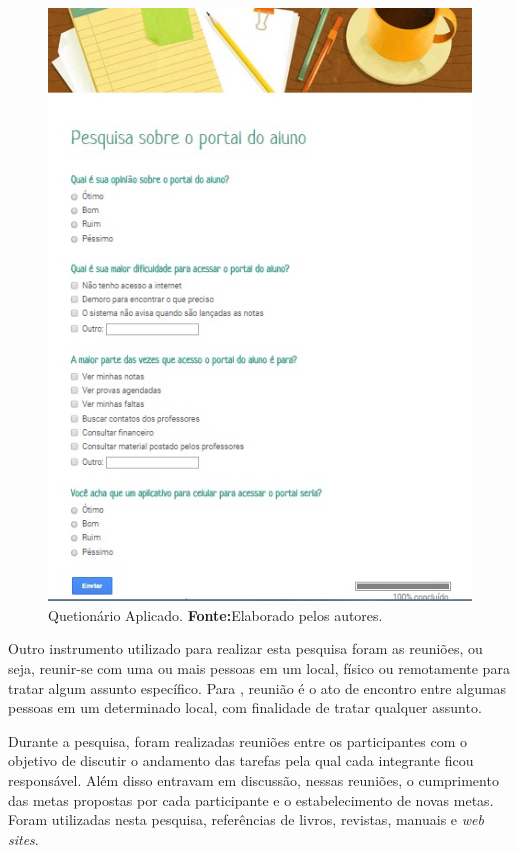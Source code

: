 \begin{figure}[h!]
	\centerline{\includegraphics[scale=0.5]{./imagens/2_q_metodologico/qm1.png}}
	\caption[Quetionário Aplicado]{Quetionário Aplicado.
		\textbf{Fonte:}Elaborado pelos autores.}
	\label{fig:qm1}
\end{figure}
	

	\par Outro instrumento utilizado para realizar esta pesquisa foram as
reuniões, ou seja, reunir-se com uma ou mais pessoas em um local, físico ou
remotamente para tratar algum assunto específico. Para
, reunião é o ato de encontro entre algumas pessoas em
um determinado local, com finalidade de tratar qualquer assunto.

	\par Durante a pesquisa, foram realizadas reuniões entre os participantes com
o objetivo de discutir o andamento das tarefas pela qual cada integrante ficou
responsável. Além disso entravam em discussão, nessas reuniões, o cumprimento
das metas propostas por cada participante e o estabelecimento de novas metas.
Foram utilizadas nesta pesquisa, referências de livros, revistas, manuais e
\textit{web sites}.


